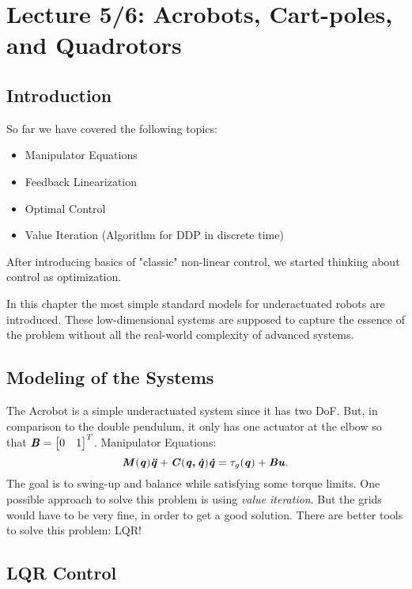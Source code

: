 \chapter{Lecture 5/6: Acrobots, Cart-poles, and Quadrotors}
\section{Introduction}
So far we have covered the following topics:
\begin{itemize}
\item Manipulator Equations
\item Feedback Linearization
\item Optimal Control
\item Value Iteration (Algorithm for DDP in discrete time)
\end{itemize}
After introducing basics of "classic" non-linear control, we started thinking about control as optimization.

In this chapter the most simple standard models for underactuated robots are introduced. These low-dimensional systems are supposed to capture the essence of the problem without all the real-world complexity of advanced systems. 


\section{Modeling of the Systems}
The Acrobot is a simple underactuated system since it has two DoF. But, in comparison to the double pendulum, it only has one actuator at the elbow so that 
$\bm{\mathit{B}}=\begin{bmatrix} 0 & 1 \end{bmatrix}^T $.
Manipulator Equations: 
\begin{equation*}
\bm{\mathit{M}}(\bm{\mathit{q}})\bm{\mathit{\ddot{q}}}+\bm{\mathit{C}}(\bm{\mathit{q,\dot{q}}})\bm{\mathit{\dot{q}}}=\tau_g(\bm{\mathit{q}})+\bm{\mathit{Bu}}.
\end{equation*}
The goal is to swing-up and balance while satisfying some torque limits. One possible approach to solve this problem is using \textit{value iteration}. But the grids would have to be very fine, in order to get a good solution. There are better tools to solve this problem: LQR!


\section{LQR Control}
